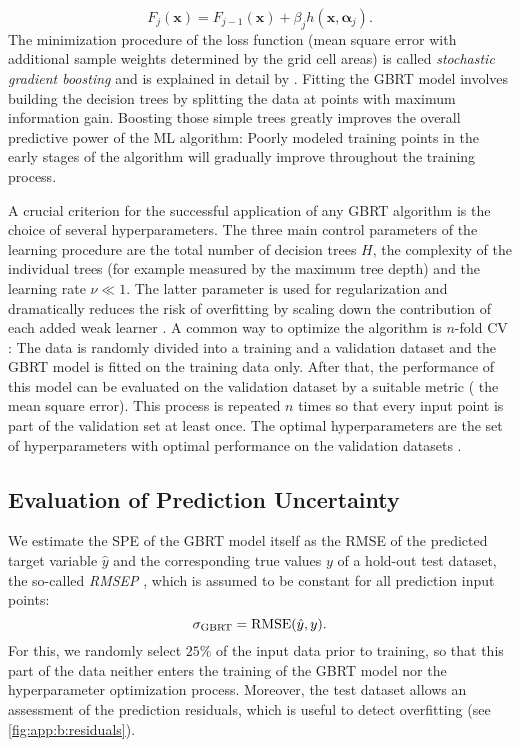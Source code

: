 \begin{equation}
  F_j(\bm{x}) = F_{j-1}(\bm{x}) + \beta_j h(\bm{x}, \bm{\alpha}_j).
  \label{eq:app:b:f_x_recursion}
\end{equation}
The minimization procedure of the loss function (mean square error with
additional sample weights determined by the grid cell areas) is called
\emph{stochastic gradient boosting} and is explained in detail by
\textcite{Friedman2001, Friedman2002}. Fitting the \ac{GBRT} model involves
building the decision trees by splitting the data at points with maximum
information gain. Boosting those simple trees greatly improves the overall
predictive power of the \ac{ML} algorithm: Poorly modeled training points in
the early stages of the algorithm will gradually improve throughout the
training process.

A crucial criterion for the successful application of any \ac{GBRT} algorithm
is the choice of several hyperparameters. The three main control parameters of
the learning procedure are the total number of decision trees $H$, the
complexity of the individual trees (for example measured by the maximum tree
depth) and the learning rate $\nu \ll 1$. The latter parameter is used for
regularization and dramatically reduces the risk of overfitting by scaling down
the contribution of each added weak learner \autocite{Death2007, Elith2008,
  Friedman2001}. A common way to optimize the algorithm is $n$-fold \acf{CV}
\autocite{Bishop2006}: The data is randomly divided into a training and a
validation dataset and the \acs{GBRT} model is fitted on the training data
only. After that, the performance of this model can be evaluated on the
validation dataset by a suitable metric (\eg{} the mean square error). This
process is repeated $n$ times so that every input point is part of the
validation set at least once. The optimal hyperparameters are the set of
hyperparameters with optimal performance on the validation datasets
\autocite{Elith2008}.


\subsection{Evaluation of Prediction Uncertainty}
\label{subsec:app:b:uncertainty}

We estimate the \acf{SPE} of the \ac{GBRT} model itself as the \ac{RMSE} of the
predicted target variable $\hat{y}$ and the corresponding true values $y$ of a
hold-out test dataset, the so-called \emph{\acf{RMSEP}} \autocite{Bishop2006},
which is assumed to be constant for all prediction input points:
\begin{equation}
  \sigma_{\textnormal{GBRT}} = \textnormal{RMSE}(\hat{y}, y).
  \label{eq:app:b:sigma_gbrt}
\end{equation}
For this, we randomly select $25 \unit{\%}$ of the input data prior to
training, so that this part of the data neither enters the training of the
\ac{GBRT} model nor the hyperparameter optimization process. Moreover, the test
dataset allows an assessment of the prediction residuals, which is useful to
detect overfitting (see \cref{fig:app:b:residuals}).


